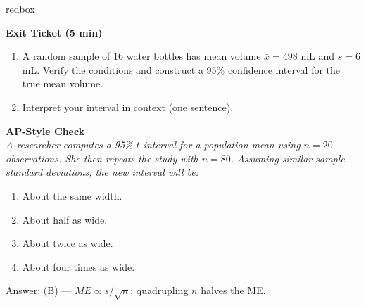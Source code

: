 \documentclass[10pt]{article}
\begin{document}
\begin{skillbox}{redbox}
\begin{minipage}[t]{0.48\linewidth}
    \textbf{Exit Ticket (5 min)}
    \begin{enumerate}
        \item A random sample of 16 water bottles has mean volume $\bar x = 498$ mL
              and $s = 6$ mL. Verify the conditions and construct a 95\% confidence
              interval for the true mean volume.
        \item Interpret your interval in context (one sentence).
    \end{enumerate}
\end{minipage}
\hfill
\begin{minipage}[t]{0.48\linewidth}
    \textbf{AP-Style Check}\\
    \textit{A researcher computes a 95\% $t$-interval for a population mean using
    $n = 20$ observations. She then repeats the study with $n = 80$. Assuming similar
    sample standard deviations, the new interval will be:}
    \begin{enumerate}[label=(\Alph*)]
        \item About the same width.
        \item About half as wide.
        \item About twice as wide.
        \item About four times as wide.
    \end{enumerate}
    Answer: (B) — $ME \propto s/\sqrt{n}$; quadrupling $n$ halves the ME.
\end{minipage}
\end{skillbox}
\end{document}
